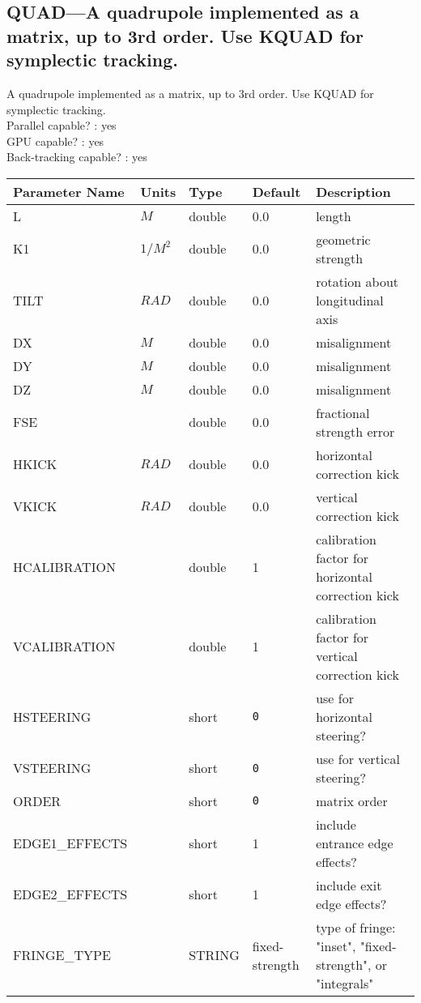 \subsection{QUAD---A quadrupole implemented as a matrix, up to 3rd order. Use KQUAD for symplectic tracking.}
A quadrupole implemented as a matrix, up to 3rd order. Use KQUAD for symplectic tracking.
\\
Parallel capable? : yes\\
GPU capable? : yes\\
Back-tracking capable? : yes\\
\begin{tabular}{|l|l|l|l|p{\descwidth}|} \hline
Parameter Name & Units & Type & Default & Description \\ \hline 
L & $M$ & double &  0.0 & length  \\ \hline 
K1 & $1/M^{2}$ & double &  0.0 & geometric strength  \\ \hline 
TILT & $RAD$ & double &  0.0 & rotation about longitudinal axis  \\ \hline 
DX & $M$ & double &  0.0 & misalignment  \\ \hline 
DY & $M$ & double &  0.0 & misalignment  \\ \hline 
DZ & $M$ & double &  0.0 & misalignment  \\ \hline 
FSE &  & double &  0.0 & fractional strength error  \\ \hline 
HKICK & $RAD$ & double &  0.0 & horizontal correction kick  \\ \hline 
VKICK & $RAD$ & double &  0.0 & vertical correction kick  \\ \hline 
HCALIBRATION &  & double &   1 & calibration factor for horizontal correction kick  \\ \hline 
VCALIBRATION &  & double &   1 & calibration factor for vertical correction kick  \\ \hline 
HSTEERING &  & short &  \verb|0| & use for horizontal steering?  \\ \hline 
VSTEERING &  & short &  \verb|0| & use for vertical steering?  \\ \hline 
ORDER &  & short &  \verb|0| & matrix order  \\ \hline 
EDGE1\_EFFECTS &  & short &   1               & include entrance edge effects?  \\ \hline 
EDGE2\_EFFECTS &  & short &   1               & include exit edge effects?  \\ \hline 
FRINGE\_TYPE &  & STRING &   fixed-strength  & type of fringe: "inset", "fixed-strength", or "integrals"  \\ \hline 

\end{tabular}
